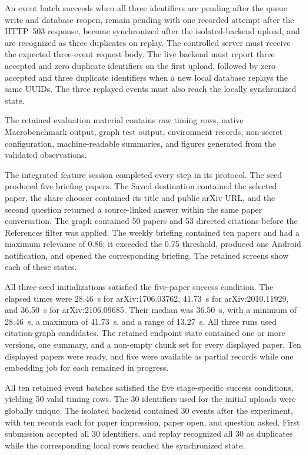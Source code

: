 An event batch succeeds when all three identifiers are pending after the queue
write and database reopen, remain pending with one recorded attempt after the
HTTP~503 response, become synchronized after the isolated-backend upload, and are
recognized as three duplicates on replay. The controlled server must receive
the expected three-event request body. The live backend must report three
accepted and zero duplicate identifiers on the first upload, followed by zero
accepted and three duplicate identifiers when a new local database replays the
same UUIDs. The three replayed events must also reach the locally synchronized
state.

The retained evaluation material contains raw timing rows, native
Macrobenchmark output, graph test output, environment records, non-secret
configuration, machine-readable summaries, and figures generated from the
validated observations.

The integrated feature session completed every step in its protocol. The seed
produced five briefing papers. The Saved destination contained the selected
paper, the share chooser contained its title and public arXiv URL, and the
second question returned a source-linked answer within the same paper
conversation. The graph contained 50 papers and 53 directed citations before
the References filter was applied. The weekly briefing contained ten papers and
had a maximum relevance of 0.86; it exceeded the 0.75 threshold, produced
one Android notification, and opened the corresponding briefing. The retained
screens show each of these states.

All three seed initializations satisfied the five-paper success condition.
The elapsed times were 28.46~s for arXiv:1706.03762, 41.73~s for
arXiv:2010.11929, and 36.50~s for arXiv:2106.09685. Their median was
36.50~s, with a minimum of 28.46~s, a maximum of 41.73~s, and a range of
13.27~s. All three runs used citation-graph candidates. The retained endpoint
state contained one or more versions, one summary, and a non-empty chunk set
for every displayed paper. Ten displayed papers were ready, and five were
available as partial records while one embedding job for each remained in
progress.

All ten retained event batches satisfied the five stage-specific success
conditions, yielding 50 valid timing rows. The 30 identifiers used for the
initial uploads were globally unique. The isolated backend contained 30 events
after the experiment, with ten records each for paper impression, paper open,
and question asked. First submission accepted all 30 identifiers, and replay
recognized all 30 as duplicates while the corresponding local rows reached the
synchronized state.
